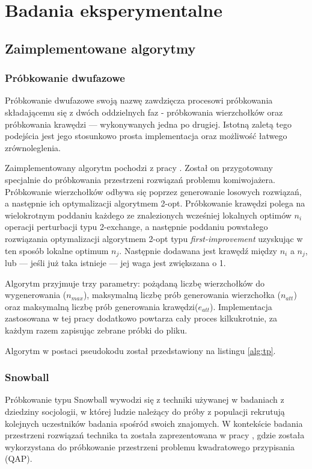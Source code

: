 \chapter{Badania eksperymentalne}

\section{Zaimplementowane algorytmy}
\subsection{Próbkowanie dwufazowe} \label{section:tp}
Próbkowanie dwufazowe swoją nazwę zawdzięcza procesowi próbkowania składającemu się z dwóch oddzielnych faz
- próbkowania wierzchołków oraz próbkowania krawędzi --- wykonywanych jedna po drugiej.
Istotną zaletą tego podejścia jest jego stosunkowo prosta implementacja oraz możliwość łatwego zrównoleglenia.

Zaimplementowany algorytm pochodzi z pracy \cite{DBLP:conf/depcos/BozejkoGNAB18}.
Został on przygotowany specjalnie do próbkowania przestrzeni rozwiązań problemu komiwojażera.
Próbkowanie wierzchołków odbywa się poprzez generowanie losowych rozwiązań, a następnie ich optymalizacji algorytmem 2-opt.
Próbkowanie krawędzi polega na wielokrotnym poddaniu każdego ze znalezionych wcześniej lokalnych optimów $n_i$ operacji perturbacji typu 2-exchange,
a następnie poddaniu powstałego rozwiązania optymalizacji algorytmem 2-opt typu \textit{first-improvement} uzyskując w ten sposób lokalne optimum $n_j$.
Następnie dodawana jest krawędź między $n_i$ a $n_j$, lub --- jeśli już taka istnieje --- jej waga jest zwiększana o 1.

Algorytm przyjmuje trzy parametry: pożądaną liczbę wierzchołków do wygenerowania ($n_{max}$), maksymalną liczbę prób generowania wierzchołka ($n_{att}$)
oraz maksymalną liczbę prób generowania krawędzi($e_{att}$).
Implementacja zastosowana w tej pracy dodatkowo powtarza cały proces kilkukrotnie, za każdym razem zapisując zebrane próbki do pliku.

Algorytm w postaci pseudokodu został przedstawiony na listingu \ref{alg:tp}.

\subsection{Snowball} \label{section:snowball}
Próbkowanie typu Snowball wywodzi się z techniki używanej w badaniach z dziedziny socjologii, w której ludzie należący do próby z populacji
rekrutują kolejnych uczestników badania spośród swoich znajomych.
W kontekście badania przestrzeni rozwiązań technika ta została zaprezentowana w pracy \cite{DBLP:conf/ppsn/VerelDOT18}, gdzie została wykorzystana
do próbkowanie przestrzeni problemu kwadratowego przypisania (QAP).

